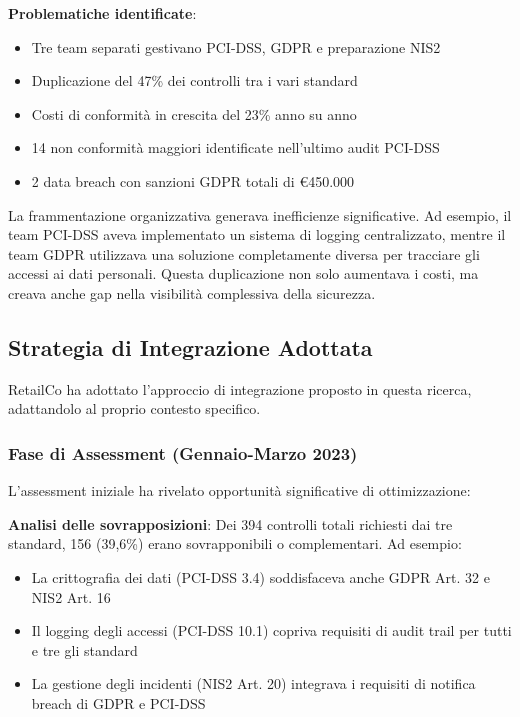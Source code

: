 \textbf{Problematiche identificate}:
\begin{itemize}
    \item Tre team separati gestivano PCI-DSS, GDPR e preparazione NIS2
    \item Duplicazione del 47\% dei controlli tra i vari standard
    \item Costi di conformità in crescita del 23\% anno su anno
    \item 14 non conformità maggiori identificate nell'ultimo audit PCI-DSS
    \item 2 data breach con sanzioni GDPR totali di €450.000
\end{itemize}

La frammentazione organizzativa generava inefficienze significative. Ad esempio, il team PCI-DSS aveva implementato un sistema di logging centralizzato, mentre il team GDPR utilizzava una soluzione completamente diversa per tracciare gli accessi ai dati personali. Questa duplicazione non solo aumentava i costi, ma creava anche gap nella visibilità complessiva della sicurezza.

\subsection{Strategia di Integrazione Adottata}
\label{subsec:4.7.2_strategia}

RetailCo ha adottato l'approccio di integrazione proposto in questa ricerca, adattandolo al proprio contesto specifico.

\subsubsection{Fase di Assessment (Gennaio-Marzo 2023)}

L'assessment iniziale ha rivelato opportunità significative di ottimizzazione:

\textbf{Analisi delle sovrapposizioni}: Dei 394 controlli totali richiesti dai tre standard, 156 (39,6\%) erano sovrapponibili o complementari. Ad esempio:
\begin{itemize}
    \item La crittografia dei dati (PCI-DSS 3.4) soddisfaceva anche GDPR Art. 32 e NIS2 Art. 16
    \item Il logging degli accessi (PCI-DSS 10.1) copriva requisiti di audit trail per tutti e tre gli standard
    \item La gestione degli incidenti (NIS2 Art. 20) integrava i requisiti di notifica breach di GDPR e PCI-DSS
\end{itemize}

